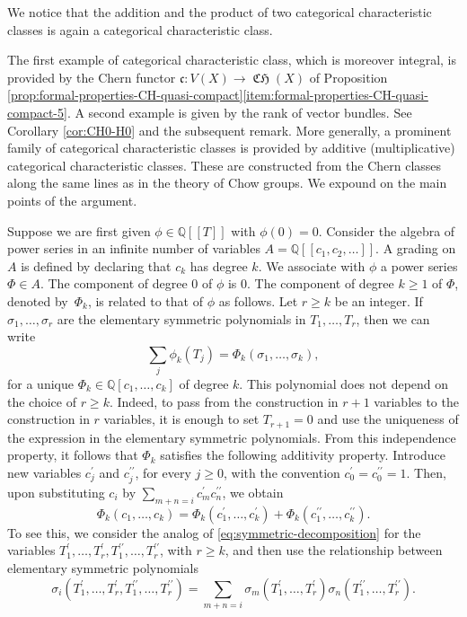 \documentclass[JEP,XML,SOM,Unicode,published]{cedram}
\newcommand{\llbracket}{[\![}
\newcommand{\rrbracket}{]\!]}
\theoremstyle{plain}
\theoremstyle{definition}
\newcommand{\QBbb}{\mathbb Q}
\newcommand{\cfrak}{\mathfrak c}
\DeclareMathOperator{\CHfrak}{\mathfrak{CH}}
\begin{document}
We notice that the addition and the product of two categorical characteristic classes is again a categorical characteristic class.

The first example of categorical characteristic class, which is moreover integral, is provided by the Chern functor $\cfrak\colon V(X)\to\CHfrak(X)$ of Proposition \ref{prop:formal-properties-CH-quasi-compact}\eqref{item:formal-properties-CH-quasi-compact-5}. A second example is given by the rank of vector bundles. See Corollary \ref{cor:CH0-H0} and the subsequent remark. More generally, a prominent family of categorical characteristic classes is provided by additive (\resp multiplicative) categorical characteristic classes. These are constructed from the Chern classes along the same lines as in the theory of Chow groups. We expound on the main points of the argument.

Suppose we are first given $\phi\in\QBbb\llbracket T\rrbracket$ with $\phi(0)=0$. Consider the algebra of power series in an infinite number of variables $A=\QBbb\llbracket c_{1},c_{2},\ldots\rrbracket$. A grading on $A$ is defined by declaring that $c_{k}$ has degree $k$. We associate with $\phi$ a power series $\Phi\in A$. The component of degree 0 of $\phi$ is 0. The component of degree $k\geq 1$ of $\Phi$, denoted by~$\Phi_{k}$, is related to that of $\phi$ as follows. Let $r\geq k$ be an integer. If $\sigma_{1},\ldots,\sigma_{r}$ are the elementary symmetric polynomials in $T_{1},\ldots, T_{r}$, then we can write
\begin{equation}\label{eq:symmetric-decomposition}
\sum_{j}\phi_{k}(T_{j})=\Phi_{k}(\sigma_{1},\ldots,\sigma_{k}),
\end{equation}
for a unique $\Phi_{k}\in\QBbb[c_{1},\ldots, c_{k}]$ of degree $k$. This polynomial does not depend on the choice of $r\geq k$. Indeed, to pass from the construction in $r+1$ variables to the construction in $r$ variables, it is enough to set $T_{r+1}=0$ and use the uniqueness of the expression in the elementary symmetric polynomials. From this independence property, it follows that $\Phi_{k}$ satisfies the following additivity property. Introduce new variables $c_{j}^{\prime}$ and $c_{j}^{\prime\prime}$, for every $j\geq 0$, with the convention $c_{0}^{\prime}=c_{0}^{\prime\prime}=1$. Then, upon substituting $c_{i}$ by $\sum_{m+n=i}c_{m}^{\prime}c_{n}^{\prime\prime}$, we obtain
\begin{equation}\label{eq:phi-additive-property}
\Phi_{k}(c_{1},\ldots,c_{k})=\Phi_{k}(c_{1}^{\prime},\ldots,c_{k}^{\prime})+\Phi_{k}(c_{1}^{\prime\prime},\ldots,c_{k}^{\prime\prime}).
\end{equation}
To see this, we consider the analog of \eqref{eq:symmetric-decomposition} for the variables $T_{1}^{\prime},\ldots,T_{r}^{\prime},T_{1}^{\prime\prime},\ldots, T_{r}^{\prime\prime}$, with $r\geq k$, and then use the relationship between elementary symmetric polynomials
\begin{displaymath}
\sigma_{i}(T_{1}^{\prime},\ldots,T_{r}^{\prime},T_{1}^{\prime\prime},\ldots, T_{r}^{\prime\prime})
=\sum_{m+n=i}\sigma_{m}(T_{1}^{\prime},\ldots,T_{r}^{\prime})\sigma_{n}(T_{1}^{\prime\prime},\ldots,T_{r}^{\prime\prime}).
\end{displaymath}
\end{document}

